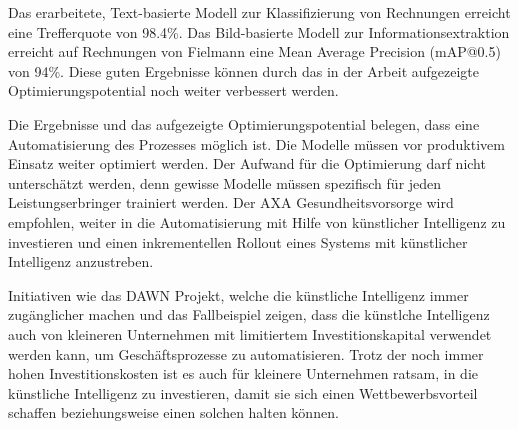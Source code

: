 {    Das erarbeitete, Text-basierte Modell zur Klassifizierung von Rechnungen erreicht eine Trefferquote von 98.4\%. Das Bild-basierte Modell zur Informationsextraktion erreicht auf Rechnungen von Fielmann eine Mean Average Precision (mAP@0.5) von 94\%. Diese guten Ergebnisse können durch das in der Arbeit aufgezeigte Optimierungspotential noch weiter verbessert werden. 
    
    Die Ergebnisse und das aufgezeigte Optimierungspotential belegen, dass eine Automatisierung des Prozesses möglich ist. Die Modelle müssen vor produktivem Einsatz weiter optimiert werden. Der Aufwand für die Optimierung darf nicht unterschätzt werden, denn gewisse Modelle müssen spezifisch für jeden Leistungserbringer trainiert werden. Der AXA Gesundheitsvorsorge wird empfohlen, weiter in die Automatisierung mit Hilfe von künstlicher Intelligenz zu investieren und einen inkrementellen Rollout eines Systems mit künstlicher Intelligenz anzustreben.
    
    Initiativen wie das DAWN Projekt, welche die künstliche Intelligenz immer zugänglicher machen und das Fallbeispiel zeigen, dass die künstlche Intelligenz auch von kleineren Unternehmen mit limitiertem Investitionskapital verwendet werden kann, um Geschäftsprozesse zu automatisieren. Trotz der noch immer hohen Investitionskosten ist es auch für kleinere Unternehmen ratsam, in die künstliche Intelligenz zu investieren, damit sie sich einen Wettbewerbsvorteil schaffen beziehungsweise einen solchen halten können.
}

\newpage

\tableofcontents

\cleardoublepage


\cleardoublepage


